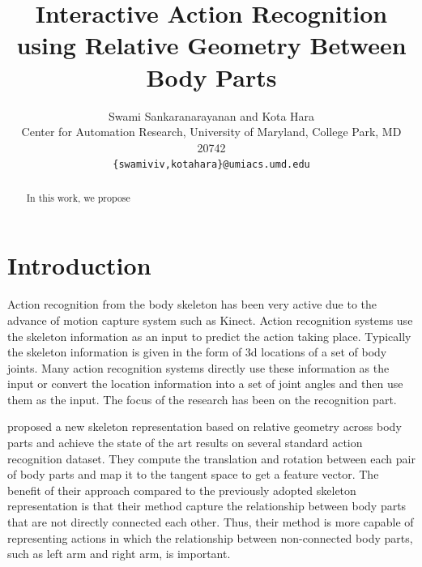 \documentclass[10pt,twocolumn,letterpaper]{article}
\begin{document}
\title{Interactive Action Recognition using Relative Geometry Between Body Parts}

\author{Swami Sankaranarayanan and Kota Hara\\
Center for Automation Research, University of Maryland, College Park, MD 20742\\
{\tt\small \{swamiviv,kotahara\}@umiacs.umd.edu}
}


\maketitle

\begin{abstract}
In this work, we propose
   
\end{abstract}

\section{Introduction}

Action recognition from the body skeleton has been very active due to the advance of motion capture system such as Kinect. Action recognition systems use the skeleton information as an input to predict the action taking place. Typically the skeleton information is given in the form of 3d locations of a set of body joints. Many action recognition systems directly use these information as the input or convert the location information into a set of joint angles and then use them as the input. The focus of the research has been on the recognition part. 

\cite{Vemulapalli2013} proposed a new skeleton representation based on relative geometry across body parts and achieve the state of the art results on several standard action recognition dataset. They compute the translation and rotation between each pair of body parts and map it to the tangent space to get a feature vector. The benefit of their approach compared to the previously adopted skeleton representation is that their method capture the relationship between body parts that are not directly connected each other. Thus, their method is more capable of representing actions in which the relationship between non-connected body parts, such as left arm and right arm, is important.
\end{document}

